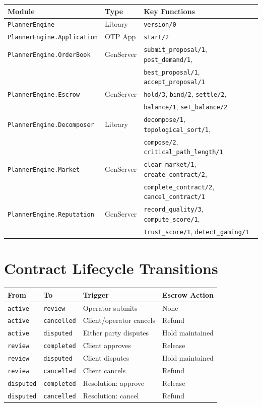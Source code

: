 \documentclass[12pt,a4paper]{article}
\theoremstyle{plain}
\theoremstyle{definition}
\begin{document}
\begin{center}
\begin{tabular}{lll}
\toprule
\textbf{Module} & \textbf{Type} & \textbf{Key Functions} \\
\midrule
\texttt{PlannerEngine} & Library & \texttt{version/0} \\
\texttt{PlannerEngine.Application} & OTP App & \texttt{start/2} \\
\texttt{PlannerEngine.OrderBook} & GenServer & \texttt{submit\_proposal/1}, \texttt{post\_demand/1}, \\
 & & \texttt{best\_proposal/1}, \texttt{accept\_proposal/1} \\
\texttt{PlannerEngine.Escrow} & GenServer & \texttt{hold/3}, \texttt{bind/2}, \texttt{settle/2}, \\
 & & \texttt{balance/1}, \texttt{set\_balance/2} \\
\texttt{PlannerEngine.Decomposer} & Library & \texttt{decompose/1}, \texttt{topological\_sort/1}, \\
 & & \texttt{compose/2}, \texttt{critical\_path\_length/1} \\
\texttt{PlannerEngine.Market} & GenServer & \texttt{clear\_market/1}, \texttt{create\_contract/2}, \\
 & & \texttt{complete\_contract/2}, \texttt{cancel\_contract/1} \\
\texttt{PlannerEngine.Reputation} & GenServer & \texttt{record\_quality/3}, \texttt{compute\_score/1}, \\
 & & \texttt{trust\_score/1}, \texttt{detect\_gaming/1} \\
\bottomrule
\end{tabular}
\end{center}

\section{Contract Lifecycle Transitions}\label{app:transitions}

\begin{center}
\begin{tabular}{llll}
\toprule
\textbf{From} & \textbf{To} & \textbf{Trigger} & \textbf{Escrow Action} \\
\midrule
\texttt{active} & \texttt{review} & Operator submits & None \\
\texttt{active} & \texttt{cancelled} & Client/operator cancels & Refund \\
\texttt{active} & \texttt{disputed} & Either party disputes & Hold maintained \\
\texttt{review} & \texttt{completed} & Client approves & Release \\
\texttt{review} & \texttt{disputed} & Client disputes & Hold maintained \\
\texttt{review} & \texttt{cancelled} & Client cancels & Refund \\
\texttt{disputed} & \texttt{completed} & Resolution: approve & Release \\
\texttt{disputed} & \texttt{cancelled} & Resolution: cancel & Refund \\
\bottomrule
\end{tabular}
\end{center}
\end{document}
